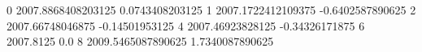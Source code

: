0 2007.8868408203125 0.0743408203125
1 2007.1722412109375 -0.6402587890625
2 2007.66748046875 -0.14501953125
4 2007.46923828125 -0.34326171875
6 2007.8125 0.0
8 2009.5465087890625 1.7340087890625
